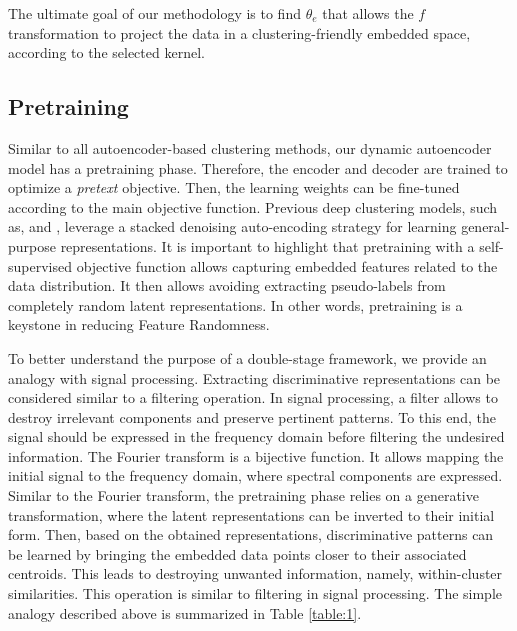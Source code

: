\documentclass{article}
\begin{document}
The ultimate goal of our methodology is to find $\theta_{e}$ that allows the $f$ transformation to project the data in a clustering-friendly embedded space, according to the selected kernel.

\subsection{Pretraining}

Similar to all autoencoder-based clustering methods, our dynamic autoencoder model has a pretraining phase. Therefore, the encoder and decoder are trained to optimize a \textit{pretext} objective. Then, the learning weights can be fine-tuned according to the main objective function. Previous deep clustering models, such as, \cite{paper27} and \cite{paper28}, leverage a stacked denoising auto-encoding strategy for learning general-purpose representations. It is important to highlight that pretraining with a self-supervised objective function allows capturing embedded features related to the data distribution. It then allows avoiding extracting pseudo-labels from completely random latent representations. In other words, pretraining is a keystone in reducing Feature Randomness.

To better understand the purpose of a double-stage framework, we provide an analogy with signal processing. Extracting discriminative representations can be considered similar to a filtering operation. In signal processing, a filter allows to destroy irrelevant components and preserve pertinent patterns. To this end, the signal should be expressed in the frequency domain before filtering the undesired information. The Fourier transform is a bijective function. It allows mapping the initial signal to the frequency domain, where spectral components are expressed. Similar to the Fourier transform, the pretraining phase relies on a generative transformation, where the latent representations can be inverted to their initial form. Then, based on the obtained representations, discriminative patterns can be learned by bringing the embedded data points closer to their associated centroids. This leads to destroying unwanted information, namely, within-cluster similarities. This operation is similar to filtering in signal processing. The simple analogy described above is summarized in Table \ref{table:1}.
\end{document}

